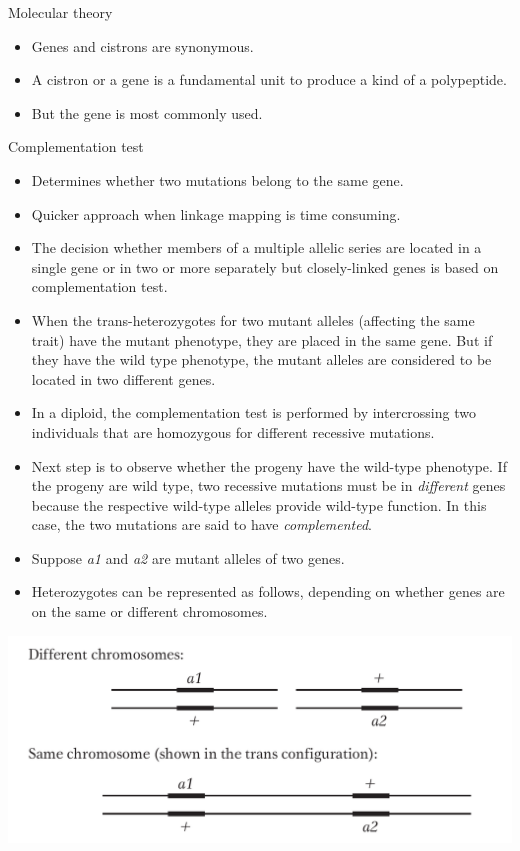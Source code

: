 \documentclass[11pt,dvipsnames,ignorenonframetext,aspectratio=169]{beamer}
\providecommand{\tightlist}{%
  \setlength{\itemsep}{0pt}\setlength{\parskip}{0pt}}
\begin{document}
\begin{frame}{Molecular theory}
\protect\hypertarget{molecular-theory}{}
\begin{itemize}
\tightlist
\item
  Genes and cistrons are synonymous.
\item
  A cistron or a gene is a fundamental unit to produce a kind of a
  polypeptide.
\item
  But the gene is most commonly used.
\end{itemize}
\end{frame}

\begin{frame}{Complementation test}
\protect\hypertarget{complementation-test}{}
\begin{itemize}
\tightlist
\item
  Determines whether two mutations belong to the same gene.
\item
  Quicker approach when linkage mapping is time consuming.
\item
  The decision whether members of a multiple allelic series are located
  in a single gene or in two or more separately but closely-linked genes
  is based on complementation test.
\item
  When the trans-heterozygotes for two mutant alleles (affecting the
  same trait) have the mutant phenotype, they are placed in the same
  gene. But if they have the wild type phenotype, the mutant alleles are
  considered to be located in two different genes.
\end{itemize}
\end{frame}

\begin{frame}{}
\protect\hypertarget{section-28}{}
\begin{itemize}
\tightlist
\item
  In a diploid, the complementation test is performed by intercrossing
  two individuals that are homozygous for different recessive mutations.
\item
  Next step is to observe whether the progeny have the wild-type
  phenotype. If the progeny are wild type, two recessive mutations must
  be in \emph{different} genes because the respective wild-type alleles
  provide wild-type function. In this case, the two mutations are said
  to have \emph{complemented}.
\item
  Suppose \emph{a1} and \emph{a2} are mutant alleles of two genes.
\item
  Heterozygotes can be represented as follows, depending on whether
  genes are on the same or different chromosomes.
\end{itemize}

\begin{center}\includegraphics[width=0.35\linewidth]{./../images/gene_location_chromosomes} \end{center}
\end{frame}
\end{document}
